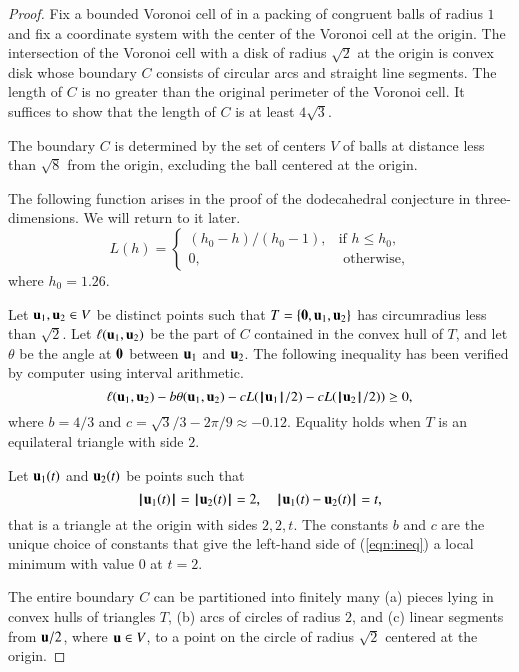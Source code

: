 \documentclass{llncs}
\begin{document}
\begin{proof} Fix a bounded Voronoi cell of in a packing of congruent
  balls of radius $1$ and fix a coordinate system with the center of
  the Voronoi cell at the origin.  The intersection of the Voronoi
  cell with a disk of radius $\sqrt2$ at the origin is convex disk
  whose boundary $C$ consists of circular arcs and straight line
  segments.  The length of $C$ is no greater than the original
  perimeter of the Voronoi cell.  It suffices to show that the length
  of $C$ is at least $4\sqrt{3}$.



The boundary $C$ is determined by the set of centers $V$ of balls at
distance less than $\sqrt8$ from the origin, excluding the ball
centered at the origin.

The following function arises in the proof of the dodecahedral
conjecture in three-dimensions.  We will return to it later.
\begin{equation}
L(h) = \begin{cases} 
   (h_0-h)/(h_0-1),& \text{if } h \le h_0,\\
  0,&\text{ otherwise},
 \end{cases}
\end{equation}
where $h_0 = 1.26$. 

Let ${\mathbf u}_1,{\mathbf u}_2\in V$ be distinct points such that
$T=\{{\mathbf 0},{\mathbf u}_1,{\mathbf u}_2\}$ has circumradius less than $\sqrt2$.  Let
$\ell({\mathbf u}_1,{\mathbf u}_2)$ be the part of $C$ contained in the convex hull of
$T$, and let $\theta$ be the angle at ${\mathbf 0}$ between ${\mathbf u}_1$ and
${\mathbf u}_2$. 
The following inequality has been verified by computer using interval
arithmetic.
\begin{equation}\label{eqn:ineq}
\ell({\mathbf u}_1,{\mathbf u}_2) - b \theta({\mathbf u}_1,{\mathbf u}_2) - c L({{\hskip0.1em|\hskip-0.15em|\hskip0.1em}{\mathbf u}_1{\hskip0.1em|\hskip-0.15em|\hskip0.1em}}/2) - c L({{\hskip0.1em|\hskip-0.15em|\hskip0.1em}{\mathbf u}_2{\hskip0.1em|\hskip-0.15em|\hskip0.1em}}/2)) \ge 0,
\end{equation}
where $b=4/3$ and $c=\sqrt3/3 - 2\pi/9 \approx -0.12$.
Equality holds when $T$ is an equilateral triangle with side $2$.

\begin{remark}
Let ${\mathbf u}_1(t)$ and ${\mathbf u}_2(t)$ be points such  that
\[
\normo{\u_1(t)}=\normo{\u_2(t)}=2,\quad \norm{\u_1(t)}{\u_2(t)}=t,
\]
that is a triangle at the origin with sides $2,2,t$.   The constants $b$ and $c$ are the unique choice
of constants that give the left-hand side of (\ref{eqn:ineq}) a local minimum with value
$0$ at $t=2$.
\end{remark}

The entire boundary $C$ can be partitioned into finitely many (a) pieces lying in convex hulls
of triangles $T$,  (b) arcs of circles of radius $2$, and (c)  linear segments
 from ${\mathbf u}/2$, where ${\mathbf u}\in V$, to a point on the circle of radius $\sqrt2$ centered at the origin.


\end{proof}
\end{document}
